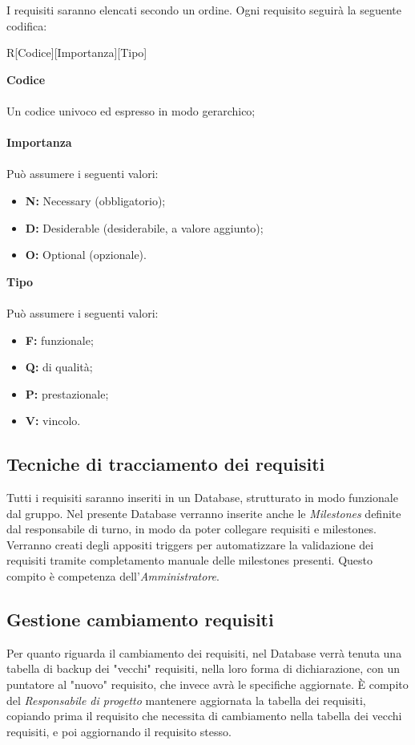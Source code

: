 \documentclass[a4paper]{report}
\begin{document}
	I requisiti saranno elencati secondo un ordine. Ogni requisito seguirà la seguente codifica: \\
	\begin{center}
		R[Codice][Importanza][Tipo]
	\end{center}
	\textbf{Codice} \\ \\ Un codice univoco ed espresso in modo gerarchico;\\ \\
	\textbf{Importanza} \\ \\Può assumere i seguenti valori:
	\begin{itemize}
		\item \textbf{N:} Necessary (obbligatorio);
		\item \textbf{D:} Desiderable (desiderabile, a valore aggiunto);
		\item \textbf{O:} Optional (opzionale).
	\end{itemize}
	\textbf{Tipo} \\ \\Può assumere i seguenti valori:
	\begin{itemize}
		\item \textbf{F:} funzionale;
		\item \textbf{Q:} di qualità;
		\item \textbf{P:} prestazionale;
		\item \textbf{V:} vincolo.
	\end{itemize}
	\subsection{Tecniche di tracciamento dei requisiti}
	Tutti i requisiti saranno inseriti in un Database, strutturato in modo funzionale dal gruppo. Nel presente Database verranno
	inserite anche le \emph{Milestones} definite dal responsabile di turno, in modo da poter collegare requisiti e milestones. 
	Verranno creati degli appositi triggers per automatizzare la validazione dei requisiti tramite completamento manuale delle
	milestones presenti. Questo compito è competenza dell'\emph{Amministratore}.
	\subsection{Gestione cambiamento requisiti}
	Per quanto riguarda il cambiamento dei requisiti, nel Database verrà tenuta una tabella di backup dei "vecchi" requisiti, 
	nella loro forma di dichiarazione, con un puntatore al "nuovo" requisito, che invece avrà le specifiche aggiornate. È compito del
	\emph{Responsabile di progetto} mantenere aggiornata la tabella dei requisiti, copiando prima il requisito che necessita di cambiamento
	nella tabella dei vecchi requisiti, e poi aggiornando il requisito stesso.
	
\end{document}
